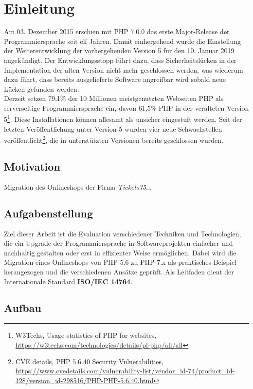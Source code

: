 \chapter{Einleitung}
Am 03. Dezember 2015 erschien mit PHP 7.0.0 das erste Major-Release der Programmiersprache seit elf Jahren. Damit einhergehend wurde die Einstellung der Weiterentwicklung der vorhergehenden Version
5 für den 10. Januar 2019 angekündigt. Der Entwicklungsstopp führt dazu, dass Sicherheitslücken in der Implementation der alten Version nicht mehr geschlossen werden, was 
wiederum dazu führt, dass bereits ausgelieferte Software angreifbar wird sobald neue Lücken gefunden werden. \\
Derzeit setzen 79,1\% der 10 Millionen meistgenutzten Webseiten PHP als serverseitige Programmiersprache ein, davon 61,5\% PHP in der veralteten Version 5\footnote{W3Techs, \glqq Usage statistics of PHP for websites\grqq , 
\url{https://w3techs.com/technologies/details/pl-php/all/all}}. Diese Installationen können allesamt als unsicher eingestuft werden. Seit der letzten Veröffentlichung 
unter Version 5 wurden vier neue Schwachstellen veröffentlicht\footnote{CVE details, \glqq PHP 5.6.40 Security Vulnerabilities\grqq , 
\url{https://www.cvedetails.com/vulnerability-list/vendor_id-74/product_id-128/version_id-298516/PHP-PHP-5.6.40.html}}, die in unterstützten Versionen bereits geschlossen 
wurden.

\section{Motivation}
Migration des Onlineshops der Firma \textit{Tickets75}...

\section{Aufgabenstellung}
Ziel dieser Arbeit ist die Evaluation verschiedener Techniken und Technologien, die ein Upgrade der Programmiersprache in Softwareprojekten einfacher und nachhaltig gestalten 
oder erst in effizienter Weise ermöglichen. Dabei wird die Migration eines Onlineshops von PHP 5.6 zu PHP 7.x als praktisches Beispiel herangezogen und die verschiedenen 
Ansätze geprüft. Als Leitfaden dient der Internationale Standard \textbf{ISO/IEC 14764}.

\section{Aufbau}
